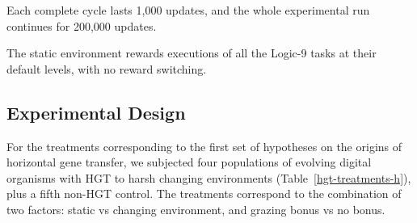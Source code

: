 \documentclass[PhD]{msu-thesis}
\begin{document}
Each complete cycle lasts 1,000 updates, and the whole experimental run continues for 200,000 updates.

The static environment rewards executions of all the Logic-9 tasks at their default levels, with no reward switching.


\subsection{Experimental Design}
For the treatments corresponding to the first set of hypotheses on the origins of horizontal gene transfer, we subjected four populations of evolving digital organisms with HGT to harsh changing environments (Table~\ref{hgt-treatments-h}), plus a fifth non-HGT control. The treatments correspond to the combination of two factors: static vs changing environment, and grazing bonus vs no bonus.


\end{document}
